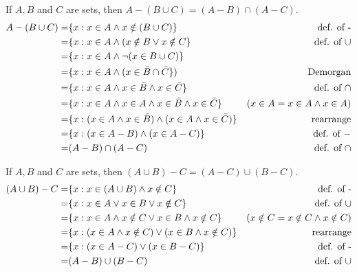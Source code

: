 \documentclass[openany, 12pt]{book}
\begin{document}
\begin{exercise}{}{}
	If $A, B$ and $C$ are sets, then $A-(B \cup C)=(A-B) \cap(A-C)$.
	\begin{align*}
		A-(B \cup C)= & \{x: x\in A \land x\notin(B \cup C)\}                               & \text{def. of -}                \\
		=             & \{x: x\in A \land (x\notin B \lor x\notin C\}                       & \text{def. of $\cup$}           \\
		=             & \{x: x\in A \land \neg{(x\in B \cup C})\}                           &                                 \\
		=             & \{x: x\in A \land (x\in \bar{B} \cap \bar{C}\})                     & \text{Demorgan}                 \\
		=             & \{x: x\in A \land x\in \bar{B} \land x\in\bar{C}\}                  & \text{def. of }\cap             \\
		=             & \{x: x\in A \land x\in A \land x\in \bar{B} \land x\in\bar{C}\}     & (x\in A = x\in A \land x \in A) \\
		=             & \{x: (x\in A \land x\in \bar{B}) \land (x\in A \land x\in\bar{C})\} & \text{rearrange}                \\
		=             & \{x: (x\in A  - B) \land (x\in A - C)\}                             & \text{def. of }-                \\
		=             & (A - B) \cap (A-C)                                                    & \text{def. of }\cap
	\end{align*}
\end{exercise}

\begin{exercise}{}{}
	If $A, B$ and $C$ are sets, then $(A \cup B)-C=(A-C) \cup(B-C)$.
	\begin{align*}
		(A\cup B) - C = & \{x: x\in (A\cup B) \land x\notin C\}                         & \text{def. of -}                         \\
		=               & \{x: x\in A \lor x \in B \lor x\notin C\}                     & \text{def. of $\cup$}                    \\
		=               & \{x: x\in A \land x\notin C \lor x\in B \land x\notin C\}     & (x\notin C = x\notin C \land x \notin C) \\
		=               & \{x: (x\in A \land x\notin C) \lor (x\in B \land x\notin C)\} & \text{rearrange}                         \\
		=               & \{x: (x\in A  - C) \lor (x\in B - C)\}                        & \text{def. of -}                         \\
		=               & (A - B) \cup (B-C)                                              & \text{def. of }\cup
	\end{align*}
\end{exercise}
\end{document}
